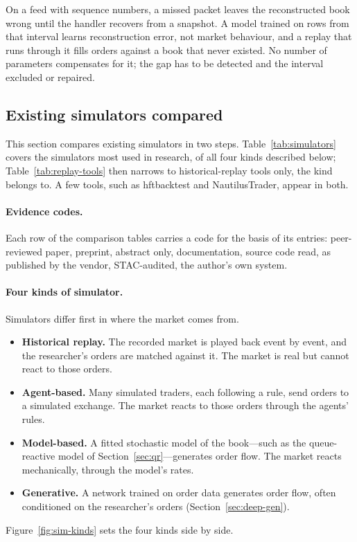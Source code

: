 \begin{example}
On a feed with sequence numbers, a missed packet leaves the reconstructed book wrong until the
handler recovers from a snapshot. A model trained on rows from that interval learns
reconstruction error, not market behaviour, and a replay that runs through it fills orders against a book that never
existed. No number of parameters compensates for it; the gap
has to be detected and the interval excluded or repaired.
\end{example}

\subsection{Existing simulators compared}
\label{sec:sim-survey}

This section compares existing simulators in two steps. Table~\ref{tab:simulators} covers the simulators most used
in research, of all four kinds described below; Table~\ref{tab:replay-tools} then narrows to historical-replay tools
only, the kind \kasparhft{} belongs to. A few tools, such as hftbacktest and NautilusTrader, appear in both.

\paragraph{Evidence codes.} Each row of the comparison tables carries a code for the basis of its entries: 
peer-reviewed paper,  preprint,  abstract only,  documentation,  source code read, 
as published by the vendor,  STAC-audited,  the author's own system.

\paragraph{Four kinds of simulator.} Simulators differ first in where the market comes from.
\begin{itemize}[leftmargin=1.5em,itemsep=1pt]
\item \textbf{Historical replay.} The recorded market is played back event by event, and the researcher's orders are
  matched against it. The market is real but cannot react to those orders.
\item \textbf{Agent-based.} Many simulated traders, each following a rule, send orders to a simulated exchange. The
  market reacts to those orders through the agents' rules.
\item \textbf{Model-based.} A fitted stochastic model of the book---such as the queue-reactive model of
  Section~\ref{sec:qr}---generates order flow. The market reacts mechanically, through the model's rates.
\item \textbf{Generative.} A network trained on order data generates order flow, often conditioned on the
  researcher's orders (Section~\ref{sec:deep-gen}).
\end{itemize}
Figure~\ref{fig:sim-kinds} sets the four kinds side by side.

